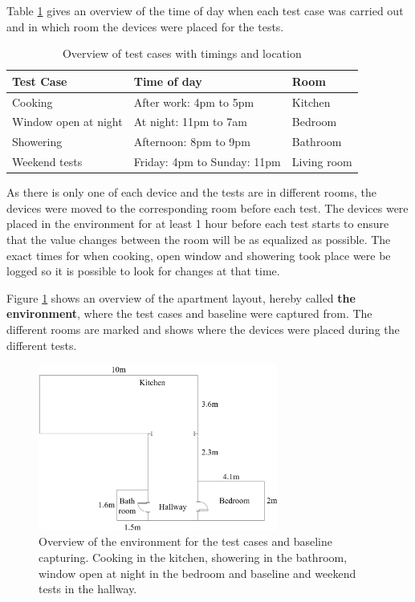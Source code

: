 Table \ref{tab:TestCases} gives an overview of the time of day when each test case was carried out and in which room the devices were placed for the tests. 
\begin{table}[H]
    \centering
    \caption{Overview of test cases with timings and location}
    \begin{adjustbox}{width=1\textwidth}
    \begin{tabular}{| p{5cm} | p{5cm} | p{3cm} |} 
        \hline
        \textbf{Test Case} & \textbf{Time of day} & \textbf{Room} \\
        \hline
        Cooking & After work: 4pm to 5pm & Kitchen \\
        \hline
        Window open at night & At night: 11pm to 7am & Bedroom\\
        \hline
        Showering & Afternoon: 8pm to 9pm & Bathroom \\
        \hline
        Weekend tests & Friday: 4pm to Sunday: 11pm & Living room \\
        \hline
    \end{tabular}
    \end{adjustbox}
    \label{tab:TestCases}
\end{table}

As there is only one of each device and the tests are in different rooms, the devices were moved to the corresponding room before each test. The devices were placed in the environment for at least 1 hour before each test starts to ensure that the value changes between the room will be as equalized as possible. The exact times for when cooking, open window and showering took place were be logged so it is possible to look for changes at that time. 

Figure \ref{fig:Apartment} shows an overview of the apartment layout, hereby called \textbf{the environment}, where the test cases and baseline were captured from. The different rooms are marked and shows where the devices were placed during the different tests. 

\begin{figure}[H]
    \centering
    \includegraphics[width=0.7\textwidth]{figures/Apartment.png}
    \caption{Overview of the environment for the test cases and baseline capturing. Cooking in the kitchen, showering in the bathroom, window open at night in the bedroom and baseline and weekend tests in the hallway.}
    \label{fig:Apartment}
\end{figure}

